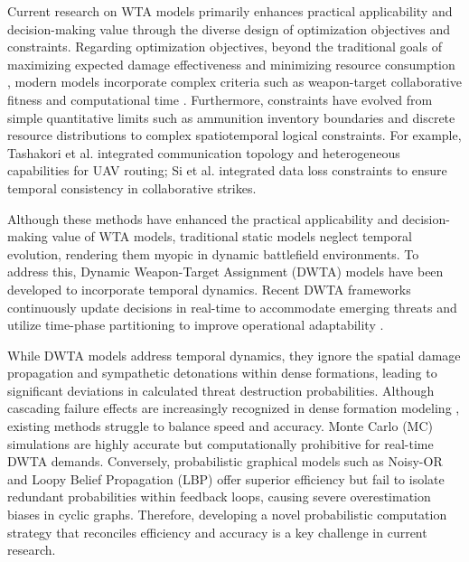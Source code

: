 \documentclass[lettersize,journal]{IEEEtran}
\begin{document}
Current research on WTA models primarily enhances practical applicability and decision-making value through the diverse design of optimization objectives and constraints. Regarding optimization objectives, beyond the traditional goals of maximizing expected damage effectiveness \cite{manne1958target} and minimizing resource consumption \cite{ma2021two}, modern models incorporate complex criteria such as weapon-target collaborative fitness \cite{xu2024dynamic} and computational time \cite{wu2023dynamic}. Furthermore, constraints have evolved from simple quantitative limits such as ammunition inventory boundaries \cite{lamba2025low} and discrete resource distributions \cite{tashakori2024dynamic} to complex spatiotemporal logical constraints. For example, Tashakori et al. \cite{tashakori2024dynamic} integrated communication topology and heterogeneous capabilities for UAV routing; Si et al. \cite{si2023online} integrated data loss constraints to ensure temporal consistency in collaborative strikes.

Although these methods have enhanced the practical applicability and decision-making value of WTA models, traditional static models neglect temporal evolution, rendering them myopic in dynamic battlefield environments. To address this, Dynamic Weapon-Target Assignment (DWTA) models have been developed to incorporate temporal dynamics. Recent DWTA frameworks continuously update decisions in real-time to accommodate emerging threats \cite{arslan2025solution} and utilize time-phase partitioning to improve operational adaptability \cite{peng2024multi}.

While DWTA models address temporal dynamics, they ignore the spatial damage propagation and sympathetic detonations within dense formations, leading to significant deviations in calculated threat destruction probabilities. Although cascading failure effects are increasingly recognized in dense formation modeling \cite{yuan2025cascading}, existing methods struggle to balance speed and accuracy. Monte Carlo (MC) simulations are highly accurate but computationally prohibitive for real-time DWTA demands. Conversely, probabilistic graphical models such as Noisy-OR and Loopy Belief Propagation (LBP) \cite{burkholz2021cascade} offer superior efficiency but fail to isolate redundant probabilities within feedback loops, causing severe overestimation biases in cyclic graphs. Therefore, developing a novel probabilistic computation strategy that reconciles efficiency and accuracy is a key challenge in current research.
\end{document}
